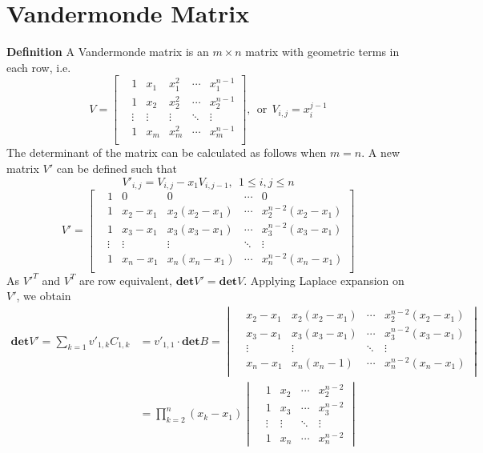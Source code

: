 \documentclass[11pt]{article}
\begin{document}
\section{Vandermonde Matrix}
\noindent \textbf{Definition} A Vandermonde matrix is an $m \times n$ matrix with geometric terms in each row, i.e.
\begin{equation}
    V = 
    \begin{bmatrix}
    & 1 & x_1 & x_1^2 & \cdots & x_1^{n-1}\\
    & 1 & x_2 & x_2^2 & \cdots & x_2^{n-1}\\
    & \vdots & \vdots & \vdots & \ddots & \vdots\\
    & 1 & x_m & x_m^2 & \cdots & x_m^{n-1}\\
    \end{bmatrix},~~
    \text{or}~~V_{i,j} = x_i^{j-1}
\end{equation}
The determinant of the matrix can be calculated as follows when $m = n$. A new matrix $V'$ can be defined such that
\begin{equation}
    V'_{i,j} = V_{i,j} - x_1V_{i,j-1},~~1\leq i,j \leq n
\end{equation}
\begin{equation}
    V' = 
    \begin{bmatrix}
    & 1 & 0 & 0 & \cdots & 0\\
    & 1 & x_2-x_1 & x_2(x_2-x_1) & \cdots & x_2^{n-2}(x_2-x_1)\\
    & 1 & x_3-x_1 & x_3(x_3-x_1) & \cdots & x_3^{n-2}(x_3-x_1)\\ 
    & \vdots & \vdots & \vdots & \ddots & \vdots\\
    & 1 & x_n-x_1 & x_n(x_n-x_1) & \cdots & x_n^{n-2}(x_n-x_1)\\
    \end{bmatrix}
\end{equation}
As $V'^{T}$ and $V^{T}$ are row equivalent, $\bm{det}V'= \bm{det}V$. Applying Laplace expansion on $V'$, we obtain
\begin{equation}
\begin{aligned}
    \bm{det}V' = \sum_{k=1}v'_{1,k}C_{1,k} &= v'_{1,1}\cdot \bm{det}B =     
    \begin{vmatrix}
    & x_2-x_1 & x_2(x_2-x_1) & \cdots & x_2^{n-2}(x_2-x_1)\\
    & x_3-x_1 & x_3(x_3-x_1) & \cdots & x_3^{n-2}(x_3-x_1)\\ 
    & \vdots & \vdots & \ddots & \vdots\\
    & x_n-x_1 & x_n(x_n-1) & \cdots & x_n^{n-2}(x_n-x_1)\\
    \end{vmatrix}\\
    &=\prod_{k=2}^{n}(x_k-x_1)
    \begin{vmatrix}
    &1 & x_2 & \cdots & x_2^{n-2}\\
    &1 & x_3 & \cdots & x_3^{n-2}\\
    &\vdots & \vdots & \ddots & \vdots\\
    &1 & x_n & \cdots & x_n^{n-2}
    \end{vmatrix}
\end{aligned}
\end{equation}
\end{document}

